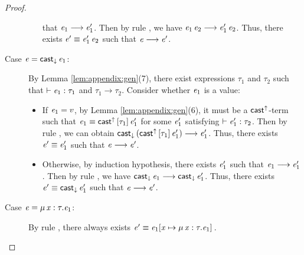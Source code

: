 \begin{proof}
\begin{description}
\begin{itemize}
that $\mathit{e_{{\mathrm{1}}}}  \longrightarrow  \mathit{e'_{{\mathrm{1}}}}$. Then by rule , we have $\mathit{e_{{\mathrm{1}}}} \, \mathit{e_{{\mathrm{2}}}}  \longrightarrow  \mathit{e'_{{\mathrm{1}}}} \, \mathit{e_{{\mathrm{2}}}}$. Thus, there exists $\mathit{e'}  \equiv  \mathit{e'_{{\mathrm{1}}}} \, \mathit{e_{{\mathrm{2}}}}$ such that $\mathit{e}  \longrightarrow  \mathit{e'}$.
    		\end{itemize}
		\item[Case $\mathit{e}=\mathsf{cast}_{\downarrow} \, \mathit{e_{{\mathrm{1}}}}$:] By Lemma \ref{lem:appendix:gen}(7),
there exist expressions $\tau_{{\mathrm{1}}}$ and $\tau_{{\mathrm{2}}}$ such that $\vdash  \mathit{e_{{\mathrm{1}}}}  :  \tau_{{\mathrm{1}}}$ and
$\tau_{{\mathrm{1}}}  \longrightarrow  \tau_{{\mathrm{2}}}$. Consider whether $\mathit{e_{{\mathrm{1}}}}$ is a value:
		     \begin{itemize}
    		    \item If $\mathit{e_{{\mathrm{1}}}}=v$, by Lemma \ref{lem:appendix:gen}(6), it must be a
$ \mathsf{cast}^{\uparrow} $-term such that $\mathit{e_{{\mathrm{1}}}}  \equiv  \mathsf{cast}^{\uparrow} \, [  \tau_{{\mathrm{1}}}  ] \,  \mathit{e'_{{\mathrm{1}}}}$ for some $\mathit{e'_{{\mathrm{1}}}}$
satisfying $\vdash  \mathit{e'_{{\mathrm{1}}}}  :  \tau_{{\mathrm{2}}}$. Then by rule , we can obtain
$\mathsf{cast}_{\downarrow} \, (  \mathsf{cast}^{\uparrow} \, [  \tau_{{\mathrm{1}}}  ] \,  \mathit{e'_{{\mathrm{1}}}}  )  \longrightarrow  \mathit{e'_{{\mathrm{1}}}}$. Thus, there exists $\mathit{e'}  \equiv  \mathit{e'_{{\mathrm{1}}}}$
such that $\mathit{e}  \longrightarrow  \mathit{e'}$.
    		    \item Otherwise, by induction hypothesis, there exists $\mathit{e'_{{\mathrm{1}}}}$ such
that $\mathit{e_{{\mathrm{1}}}}  \longrightarrow  \mathit{e'_{{\mathrm{1}}}}$. Then by rule , we have $\mathsf{cast}_{\downarrow} \, \mathit{e_{{\mathrm{1}}}}  \longrightarrow  \mathsf{cast}_{\downarrow} \, \mathit{e'_{{\mathrm{1}}}}$. Thus, there exists $\mathit{e'}  \equiv  \mathsf{cast}_{\downarrow} \, \mathit{e'_{{\mathrm{1}}}}$ such that
$\mathit{e}  \longrightarrow  \mathit{e'}$.
    		\end{itemize}
		\item[Case $\mathit{e}=\mu \, \mathit{x}  :  \tau  .  \mathit{e_{{\mathrm{1}}}}$:] By rule , there always
exists $\mathit{e'}  \equiv  \mathit{e_{{\mathrm{1}}}}  [  \mathit{x}  \mapsto  \mu \, \mathit{x}  :  \tau  .  \mathit{e_{{\mathrm{1}}}}  ] \,$.
    \end{description}
\end{proof}


